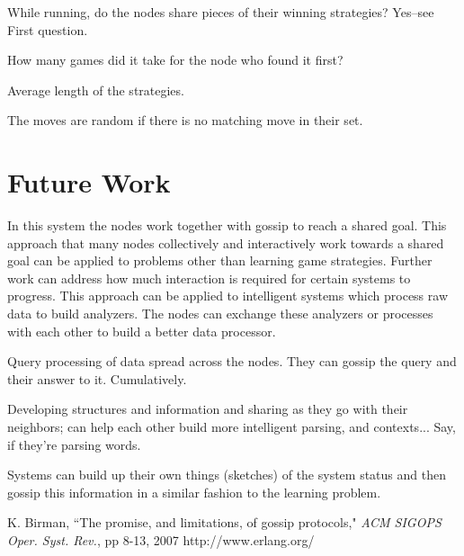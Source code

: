 \documentclass[11pt,twocolumn]{article}
\begin{document}
While running, do the nodes share pieces of their winning strategies?  Yes--see First question.

How many games did it take for the node who found it first?

Average length of the strategies.

The moves are random if there is no matching move in their set.

\section{Future Work}

In this system the nodes work together with gossip to reach a shared goal.  This approach that many nodes collectively and interactively work towards a shared goal can be applied to problems other than learning game strategies.  Further work can address how much interaction is required for certain systems to progress.  This approach can be applied to intelligent systems which process raw data to build analyzers.  The nodes can exchange these analyzers or processes with each other to build a better data processor.

Query processing of data spread across the nodes.  They can gossip the query and their answer to it.  Cumulatively.

Developing structures and information and sharing as they go with their neighbors; can help each other build more intelligent parsing, and contexts... Say, if they're parsing words.

Systems can build up their own things (sketches) of the system status and then gossip this information in a similar fashion to the learning problem.

\begin{thebibliography}{10}
K. Birman, ``The promise, and limitations, of gossip protocols," \emph{ACM SIGOPS Oper. Syst. Rev.}, pp 8-13, 2007
http://www.erlang.org/
\end{thebibliography}
\end{document}
